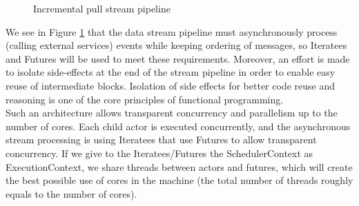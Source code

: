 \begin{figure}[h]
  \begin{center} 
    \caption{Incremental pull stream pipeline}
    \label{fig:datintflow}
  \end{center}
\end{figure}

We see in Figure \ref{fig:datintflow} that the data stream pipeline must asynchronously process (calling external services) events while keeping ordering of messages, so Iteratees and Futures will be used to meet these requirements.
Moreover, an effort is made to isolate side-effects at the end of the stream pipeline in order to enable easy reuse of intermediate blocks. Isolation of side effects for better code reuse and reasoning is one of the core principles of functional programming.
\\

Such an architecture allows transparent concurrency and parallelism up to the number of cores. Each child actor is executed concurrently, and the asynchronous stream processing is using Iteratees that use Futures to allow transparent concurrency. If we give to the Iteratees/Futures the SchedulerContext as ExecutionContext, we share threads between actors and futures, which will create the best possible use of cores in the machine (the total number of threads roughly equals to the number of cores).

